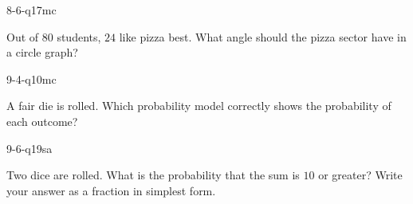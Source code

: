 \begin{practiceQuestion}{8-6-q17}{mc}
\begin{questionText}
Out of $80$ students, $24$ like pizza best. What angle should the pizza sector have in a circle graph?
\end{questionText}
\end{practiceQuestion}

\begin{practiceQuestion}{9-4-q10}{mc}
\begin{questionText}
A fair die is rolled. Which probability model correctly shows the probability of each outcome?
\end{questionText}
\end{practiceQuestion}

\begin{practiceQuestion}{9-6-q19}{sa}
\begin{questionText}
Two dice are rolled. What is the probability that the sum is $10$ or greater? Write your answer as a fraction in simplest form.
\end{questionText}
\end{practiceQuestion}

